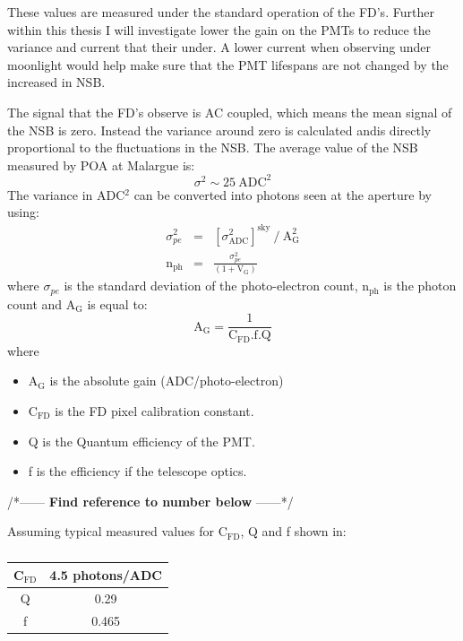 These values are measured under the standard operation of the FD's. Further within this thesis I will investigate lower the gain on the PMTs to reduce the variance and current that their under. A lower current when observing under moonlight would help make sure that the PMT lifespans are not changed by the increased in NSB.

The signal that the FD's observe is AC coupled, which means the mean signal of the NSB is zero. Instead the variance around zero is calculated andis directly proportional to the fluctuations in the NSB. The average value of the NSB measured by POA at Malargue is:
\begin{equation}
\sigma^2 \sim 25 \ \mathrm{ADC}^2
\end{equation}
The variance in ADC$^2$ can be converted into photons seen at the aperture by using:
\begin{eqnarray}
\sigma^2_{pe} &=& [\sigma^2_{\mathrm{ADC}}]^{\mathrm{sky}} \ / \ \mathrm{A}^2_{\mathrm{G}} \label{eq:simgaPE} \\
\mathrm{n}_{\mathrm{ph}} &=& \frac{\sigma^2_{pe}}{(1 + \mathrm{V}_{\mathrm{G}})} \label{eq:numPhoton}
\end{eqnarray}
where $\sigma_{pe}$ is the standard deviation of the photo-electron count, n$_{\mathrm{ph}}$ is the photon count and A$_{\mathrm{G}}$ is equal to:
\begin{equation}\label{eq:abs_gain}
\mathrm{A}_{\mathrm{G}} = \frac{1}{\mathrm{C}_{\mathrm{FD}}.\mathrm{f}.\mathrm{Q}}
\end{equation}
where
\begin{itemize}
\item[] A$_{\mathrm{G}}$ is the absolute gain (ADC/photo-electron)
\item[] $\mathrm{C}_{\mathrm{FD}}$ is the FD pixel calibration constant.
\item[] Q is the Quantum efficiency of the PMT.
\item[] f is the efficiency if the telescope optics.
\end{itemize}

/*------ \textbf{Find reference to number below} ------*/

Assuming typical measured values for C$_{\mathrm{FD}}$, Q and f shown in:
\begin{table}[h]
\begin{center}
\begin{tabular}{|c|c|}
\hline
C$_{\mathrm{FD}}$ & 4.5 photons/ADC \\
\hline
Q & 0.29 \\
\hline
f & 0.465 \\
\hline
\end{tabular} 
\end{center}
\caption{} 
\end{table} \label{tab:CFD_Q_F}

